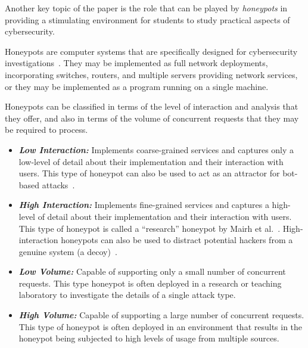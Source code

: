 \documentclass[10pt,journal]{IEEEtran}
\begin{document}
Another key topic of the paper is the role that can be played by \emph{honeypots}
in providing a stimulating environment for students to study practical
aspects of cybersecurity.

Honeypots are computer systems that are specifically designed for
cybersecurity investigations~\cite{FKAS:17,BCF:12}. They may be
implemented as full network deployments, incorporating switches, routers, and
multiple servers providing network services, or they may be implemented as a
program running on a single machine. 

Honeypots can be classified in terms of the level of interaction and
analysis that they offer, and also in terms of the volume of concurrent requests
that they may be required to process.

\begin{itemize}

  \item \noindent \emph{\textbf{Low Interaction:}} Implements coarse-grained
    services and captures only a low-level of detail about their implementation
    and their interaction with users.  This type of honeypot can also be used
    to act as an attractor for bot-based attacks~\cite{SZB:16}.  

  \item \noindent \emph{\textbf{High Interaction:}} Implements fine-grained
    services and captures a high-level of detail about their implementation and
    their interaction with users.  This type of honeypot is called a
    ``research'' honeypot by Mairh et al.~\cite{MBVJ:11}. High-interaction
    honeypots can also be used to distract potential hackers from a genuine
    system (a decoy)~\cite{M:06,SNKA:12}.

\end{itemize}


\begin{itemize}

  \item \noindent \emph{\textbf{Low Volume:}} Capable of supporting only a
    small number of concurrent requests.  This type honeypot is often deployed
    in a research or teaching laboratory to investigate the details of a single
    attack type.

  \item \noindent \emph{\textbf{High Volume:}} Capable of supporting a large
    number of concurrent requests. This type of honeypot is often deployed in
    an environment that results in the honeypot being subjected to high levels
    of usage from multiple sources. 

\end{itemize}
\end{document}
